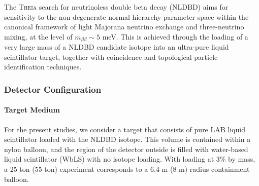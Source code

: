 %
%
%
%
%

The \textsc{Theia} search for neutrinoless double beta decay (NLDBD) aims for
sensitivity to the non-degenerate normal hierarchy parameter space
within the canonical framework of light Majorana neutrino exchange and
three-neutrino mixing, at the level of $m_{\beta\beta}\sim5$ meV.
This is achieved through the loading of a very large
mass of a NLDBD candidate isotope into an ultra-pure liquid scintillator
target, together with coincidence and topological particle identification
techniques.

\subsubsection{Detector Configuration}
\paragraph{Target Medium}
For the present studies, we consider a target that consists of pure LAB
liquid scintillator loaded with the NLDBD isotope. This volume is contained
within a nylon balloon, and the region of the detector outside is
filled with water-based liquid scintillator (WbLS) with no isotope loading.
With loading at 3\% by mass, a 25 ton (55 ton) experiment corresponds to a
6.4 m (8 m) radius containment balloon.


